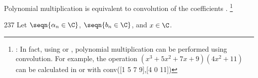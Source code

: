 Polynomial multiplication is equivalent to 
convolution  of the coefficients .
\footnote{
  : In fact, using \texttrademark\hspace{1ex} or \texttrademark,
  polynomial multiplication can be performed using convolution.
  For example, the operation 
  $(x^3 + 5x^2 + 7x + 9)(4x^2 + 11)$ can be calculated in 
  \texttrademark\hspace{1ex} or \texttrademark\hspace{1ex} with 
  conv([1 5 7 9],[4 0 11])
  }
\begin{theorem}
\label{thm:polymult}
\citep{apostol1975}{237}
Let $\seqn{\alpha_n\in\C}$, $\seqn{b_n\in\C}$, and $x\in\C$.
\end{theorem}
